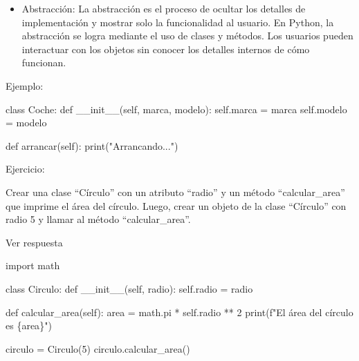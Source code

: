 \documentclass[
  a4paper,
  DIV=11,
  numbers=noendperiod,
  onepage,
  openany]{scrreprt}
\newenvironment{Shaded}{\begin{snugshade}}{\end{snugshade}}
\newcommand{\BuiltInTok}[1]{\textcolor[rgb]{0.00,0.23,0.31}{#1}}
\newcommand{\DecValTok}[1]{\textcolor[rgb]{0.68,0.00,0.00}{#1}}
\newcommand{\FunctionTok}[1]{\textcolor[rgb]{0.28,0.35,0.67}{#1}}
\newcommand{\ImportTok}[1]{\textcolor[rgb]{0.00,0.46,0.62}{#1}}
\newcommand{\KeywordTok}[1]{\textcolor[rgb]{0.00,0.23,0.31}{#1}}
\newcommand{\NormalTok}[1]{\textcolor[rgb]{0.00,0.23,0.31}{#1}}
\newcommand{\OperatorTok}[1]{\textcolor[rgb]{0.37,0.37,0.37}{#1}}
\newcommand{\SpecialCharTok}[1]{\textcolor[rgb]{0.37,0.37,0.37}{#1}}
\newcommand{\SpecialStringTok}[1]{\textcolor[rgb]{0.13,0.47,0.30}{#1}}
\newcommand{\StringTok}[1]{\textcolor[rgb]{0.13,0.47,0.30}{#1}}
\newcommand{\VariableTok}[1]{\textcolor[rgb]{0.07,0.07,0.07}{#1}}
\providecommand{\tightlist}{%
  \setlength{\itemsep}{0pt}\setlength{\parskip}{0pt}}\usepackage{longtable,booktabs,array}
\begin{document}
\begin{itemize}
\tightlist
\item
  Abstracción: La abstracción es el proceso de ocultar los detalles de
  implementación y mostrar solo la funcionalidad al usuario. En Python,
  la abstracción se logra mediante el uso de clases y métodos. Los
  usuarios pueden interactuar con los objetos sin conocer los detalles
  internos de cómo funcionan.
\end{itemize}

Ejemplo:

\begin{Shaded}
\begin{Highlighting}[]
\KeywordTok{class}\NormalTok{ Coche:}
    \KeywordTok{def} \FunctionTok{\_\_init\_\_}\NormalTok{(}\VariableTok{self}\NormalTok{, marca, modelo):}
        \VariableTok{self}\NormalTok{.marca }\OperatorTok{=}\NormalTok{ marca}
        \VariableTok{self}\NormalTok{.modelo }\OperatorTok{=}\NormalTok{ modelo}

    \KeywordTok{def}\NormalTok{ arrancar(}\VariableTok{self}\NormalTok{):}
        \BuiltInTok{print}\NormalTok{(}\StringTok{"Arrancando..."}\NormalTok{)}
\end{Highlighting}
\end{Shaded}

Ejercicio:

Crear una clase ``Círculo'' con un atributo ``radio'' y un método
``calcular\_area'' que imprime el área del círculo. Luego, crear un
objeto de la clase ``Círculo'' con radio 5 y llamar al método
``calcular\_area''.

Ver respuesta

\begin{Shaded}
\begin{Highlighting}[]
\ImportTok{import}\NormalTok{ math}

\KeywordTok{class}\NormalTok{ Circulo:}
    \KeywordTok{def} \FunctionTok{\_\_init\_\_}\NormalTok{(}\VariableTok{self}\NormalTok{, radio):}
        \VariableTok{self}\NormalTok{.radio }\OperatorTok{=}\NormalTok{ radio}

    \KeywordTok{def}\NormalTok{ calcular\_area(}\VariableTok{self}\NormalTok{):}
\NormalTok{        area }\OperatorTok{=}\NormalTok{ math.pi }\OperatorTok{*} \VariableTok{self}\NormalTok{.radio }\OperatorTok{**} \DecValTok{2}
        \BuiltInTok{print}\NormalTok{(}\SpecialStringTok{f"El área del círculo es }\SpecialCharTok{\{}\NormalTok{area}\SpecialCharTok{\}}\SpecialStringTok{"}\NormalTok{)}

\NormalTok{circulo }\OperatorTok{=}\NormalTok{ Circulo(}\DecValTok{5}\NormalTok{)}
\NormalTok{circulo.calcular\_area()}
\end{Highlighting}
\end{Shaded}
\end{document}
